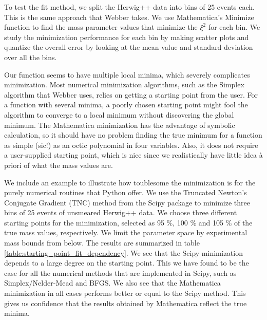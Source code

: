 \documentclass[twoside,english]{uiofysmaster}
\begin{document}
To test the fit method, we split the {\ttfamily Herwig++} data into bins of 25 events each. This is the same approach that Webber takes. We use Mathematica's {\ttfamily Minimize} function to find the mass parameter values that minimize the $\xi^2$ for each bin. We study the minimization performance for each bin by making scatter plots and quantize the overall error by looking at the mean value and standard deviation over all the bins.

Our function seems to have multiple local minima, which severely complicates minimization. Most numerical minimization algorithms, such as the Simplex algorithm that Webber uses, relies on getting a starting point from the user. For a function with several minima, a poorly chosen starting point might fool the algorithm to converge to a local minimum without discovering the global minimum. The Mathematica minimization has the advantage of symbolic calculation, so it should have no problem finding the true minimum for a function as simple (sic!) as an octic polynomial in four variables. Also, it does not require a user-supplied starting point, which is nice since we realistically have little idea \`{a} priori of what the mass values are. 

We include an example to illustrate how toublesome the minimization is for the purely numerical routines that Python offer. We use the Truncated Newton's Conjugate Gradient (TNC) method from the Scipy \cite{SciPy} package to minimize three bins of 25 events of unsmeared {\ttfamily Herwig++} data. We choose three different starting points for the minimization, selected as 95 \%, 100 \% and 105 \% of the true mass values, respectively. We limit the parameter space by experimental mass bounds from below. The results are summarized in table \ref{table:starting_point_fit_dependency}. We see that the Scipy minimization depends to a large degree on the starting point. This we have found to be the case for all the numerical methods that are implemented in Scipy, such as Simplex/Nelder-Mead and BFGS. We also see that the Mathematica minimization in all cases performs better or equal to the Scipy method. This gives us confidence that the results obtained by Mathematica reflect the true minima. 
\end{document}
